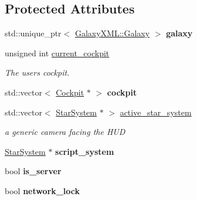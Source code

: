 \subsection*{Protected Attributes}
\begin{DoxyCompactItemize}
\item 
std\+::unique\+\_\+ptr$<$ \hyperlink{classGalaxyXML_1_1Galaxy}{Galaxy\+X\+M\+L\+::\+Galaxy} $>$ {\bfseries galaxy}\hypertarget{classUniverse_a15048b2dc57f7a25e7aeca48b5b2c18d}{}\label{classUniverse_a15048b2dc57f7a25e7aeca48b5b2c18d}

\item 
unsigned int \hyperlink{classUniverse_a6b4f838f379761dc5c494f795164ba21}{current\+\_\+cockpit}\hypertarget{classUniverse_a6b4f838f379761dc5c494f795164ba21}{}\label{classUniverse_a6b4f838f379761dc5c494f795164ba21}

\begin{DoxyCompactList}\small\item\em The users cockpit. \end{DoxyCompactList}\item 
std\+::vector$<$ \hyperlink{classCockpit}{Cockpit} $\ast$ $>$ {\bfseries cockpit}\hypertarget{classUniverse_acb7b62c66dd501b7e1ac70b445e4efc0}{}\label{classUniverse_acb7b62c66dd501b7e1ac70b445e4efc0}

\item 
std\+::vector$<$ \hyperlink{classStarSystem}{Star\+System} $\ast$ $>$ \hyperlink{classUniverse_a892535cda03f92e53397feaab2379042}{active\+\_\+star\+\_\+system}
\begin{DoxyCompactList}\small\item\em a generic camera facing the H\+UD \end{DoxyCompactList}\item 
\hyperlink{classStarSystem}{Star\+System} $\ast$ {\bfseries script\+\_\+system}\hypertarget{classUniverse_aac2186caf9dcd498ded16d733fc00ff1}{}\label{classUniverse_aac2186caf9dcd498ded16d733fc00ff1}

\item 
bool {\bfseries is\+\_\+server}\hypertarget{classUniverse_a7b6a8cd4073f04e8c9d220b3746a5a89}{}\label{classUniverse_a7b6a8cd4073f04e8c9d220b3746a5a89}

\item 
bool {\bfseries network\+\_\+lock}\hypertarget{classUniverse_a3911b7790b01be15cda0b88ff25d08e0}{}\label{classUniverse_a3911b7790b01be15cda0b88ff25d08e0}

\end{DoxyCompactItemize}
